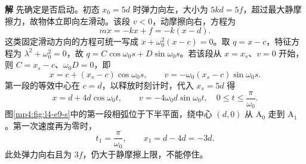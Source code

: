 \documentclass[11pt,openany,fontset=fandol]{ctexbook}
\theoremstyle{definition}\newtheorem{example}{例}[chapter]\newtheorem{exercise}{习题}[chapter]
\newcommand{\SolutionStart}{\par\medskip\ifdim\pagetotal>0pt\ifdim\dimexpr\pagegoal-\pagetotal\relax<3\baselineskip\newpage\fi\fi\noindent\textbf{解}\quad\ignorespaces}
\newenvironment{solution}{\SolutionStart}{\par\medskip}
\begin{document}
\begin{solution}
先确定是否启动。初态 $x_0=5d$ 时弹力向左，大小为 $5kd=5f$，超过最大静摩擦力，故物体立即向左滑动。该段 $v<0$，动摩擦向右，方程为
\[
m\ddot x=-kx+f=-k(x-d).
\]
这类固定滑动方向的方程可统一写成 $\ddot x+\omega_0^2(x-c)=0$。取 $q=x-c$，特征方程为 $\lambda^2+\omega_0^2=0$，故 $q=C\cos\omega_0s+D\sin\omega_0s$。若该段从 $x=x_s$、$v=0$ 开始，则 $C=x_s-c$、$\omega_0D=0$，即
\[
x=c+(x_s-c)\cos\omega_0s,\qquad
v=-\omega_0(x_s-c)\sin\omega_0s.
\]
第一段的等效中心在 $c=d$，以释放时刻计时，代入 $x_s=5d$ 得
\[
x=d+4d\cos\omega_0t,\qquad
v=-4\omega_0d\sin\omega_0t,
\quad 0\le t\le\frac\pi{\omega_0}.
\]
图\ref{mp4:fig:l4-e9-s}中的第一段相弧位于下半平面，绕中心 $(d,0)$ 从 A$_0$ 走到 A$_1$。第一次速度再为零时，
\[
t_1=\frac\pi{\omega_0},\qquad x_1=d-4d=-3d.
\]
此处弹力向右且为 $3f$，仍大于静摩擦上限，不能停住。


\end{solution}
\end{document}
